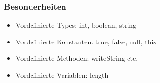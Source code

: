 \subsubsection{Besonderheiten}
\begin{itemize}[topsep=0pt]
    \itemsep -0.2em
    \item Vordefinierte Types: int, boolean, string
    \item Vordefinierte Konstanten: true, false, null, this
    \item Vordefinierte Methoden: writeString etc.
    \item Vordefinierte Variablen: length
\end{itemize}

